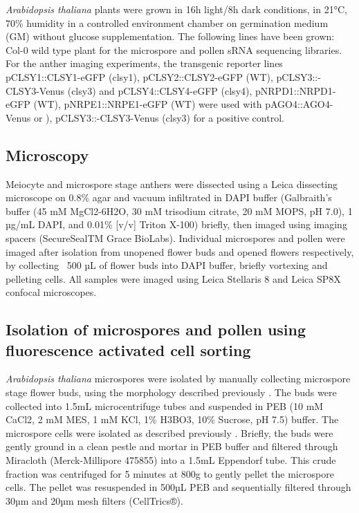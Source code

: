 \textit{Arabidopsis thaliana} plants were grown in 16h light/8h dark conditions, in 21°C, 70\% humidity in a controlled environment chamber on germination medium (GM) without glucose supplementation. The following lines have been grown: Col-0 wild type plant for the microspore and pollen sRNA sequencing libraries. For the anther imaging experiments, the transgenic reporter lines pCLSY1::CLSY1-eGFP (clsy1), pCLSY2::CLSY2-eGFP (WT), pCLSY3::-CLSY3-Venus (clsy3) and pCLSY4::CLSY4-eGFP (clsy4), pNRPD1::NRPD1-eGFP (WT), pNRPE1::NRPE1-eGFP (WT) were used with pAGO4::AGO4-Venus or ), pCLSY3::-CLSY3-Venus (clsy3) for a positive control.

\subsection{Microscopy}

Meiocyte and microspore stage anthers were dissected using a Leica dissecting microscope on 0.8\% agar and vacuum infiltrated in DAPI buffer (Galbraith’s buffer (45 mM MgCl2-6H2O, 30 mM trisodium citrate, 20 mM MOPS, pH 7.0), 1 µg/mL DAPI, and 0.01\% [v/v] Triton X-100) briefly, then imaged using imaging spacers (SecureSealTM Grace BioLabs). Individual microspores and pollen were imaged after isolation from unopened flower buds and opened flowers respectively, by collecting ~500 µL of flower buds into DAPI buffer, briefly vortexing and pelleting cells. All samples were imaged using Leica Stellaris 8 and Leica SP8X confocal microscopes.

\subsection{Isolation of microspores and pollen using fluorescence activated cell sorting}

\textit{Arabidopsis thaliana} microspores were isolated by manually collecting microspore stage flower buds, using the morphology described previously \citep{RN86}. The buds were collected into 1.5mL microcentrifuge tubes and suspended in PEB (10 mM CaCl2, 2 mM MES, 1 mM KCl, 1\% H3BO3, 10\% Sucrose, pH 7.5) buffer. The microspore cells were isolated as described previously \citep{RN140}. Briefly, the buds were gently ground in a clean pestle and mortar in PEB buffer and filtered through Miracloth (Merck-Millipore 475855) into a 1.5mL Eppendorf tube. This crude fraction was centrifuged for 5 minutes at 800g to gently pellet the microspore cells. The pellet was resuspended in 500µL PEB and sequentially filtered through 30µm and 20µm mesh filters (CellTrics®).

